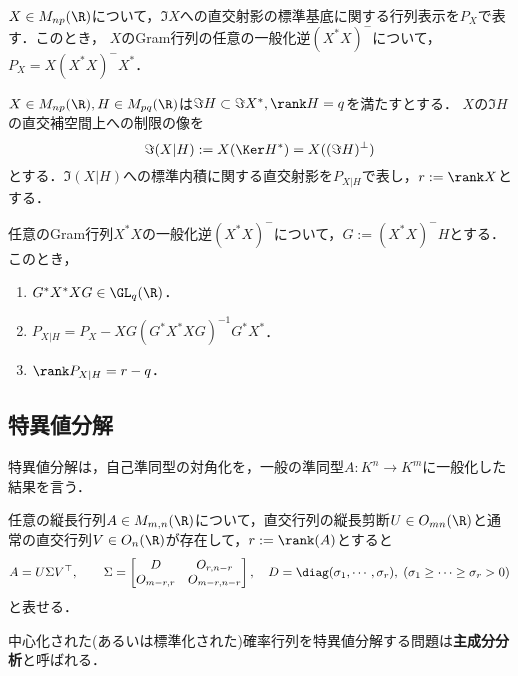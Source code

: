 \documentclass[uplatex, dvipdfmx]{jsreport}
\begin{document}
\begin{theorem}[直交射影の一般化逆行列による表示]
    $X\in M_{np}(\R)$について，$\Im X$への直交射影の標準基底に関する行列表示を$P_X$で表す．このとき，
    $X$のGram行列の任意の一般化逆$(X^*X)^-$について，
    $P_X=X(X^*X)^-X^*$．
\end{theorem}

\begin{notation}
    $X\in M_{np}(\R),H\in M_{pq}(\R)$は$\Im H\subset\Im X^*,\rank H=q$を満たすとする．
    $X$の$\Im H$の直交補空間上への制限の像を
    \[\Im(X|H):=X(\Ker H^*)=X((\Im H)^\perp)\]
    とする．$\Im(X|H)$への標準内積に関する直交射影を$P_{X|H}$で表し，$r:=\rank X$とする．
\end{notation}

\begin{theorem}[直交射影の制限の一般化逆行列による表示]
    任意のGram行列$X^*X$の一般化逆$(X^*X)^-$について，$G:=(X^*X)^-H$とする．
    このとき，
    \begin{enumerate}
        \item $G^*X^*XG\in \GL_q(\R)$．
        \item $P_{X|H}=P_X-XG(G^*X^*XG)^{-1}G^*X^*$．
        \item $\rank P_{X|H}=r-q$．
    \end{enumerate}
\end{theorem}

\subsection{特異値分解}

\begin{tcolorbox}[colframe=ForestGreen, colback=ForestGreen!10!white,breakable,colbacktitle=ForestGreen!40!white,coltitle=black,fonttitle=\bfseries\sffamily,
title=]
    特異値分解は，自己準同型の対角化を，一般の準同型$A:K^n\to K^m$に一般化した結果を言う．
\end{tcolorbox}

\begin{proposition}
    任意の縦長行列$A\in M_{m,n}(\R)$について，直交行列の縦長剪断$U\in O_{mn}(\R)$と通常の直交行列$V\in O_n(\R)$が存在して，$r:=\rank(A)$とすると
    \[A=U\Sigma V^\top,\qquad\Sigma=\begin{bmatrix}D&O_{r,n-r}\\O_{m-r,r}&O_{m-r,n-r}\end{bmatrix},\quad D=\diag(\sigma_1,\cdots,\sigma_r),\;(\sigma_1\ge\cdots\ge\sigma_r>0)\]
    と表せる．
\end{proposition}
\begin{remarks}
    中心化された(あるいは標準化された)確率行列を特異値分解する問題は\textbf{主成分分析}と呼ばれる．
\end{remarks}
\end{document}
